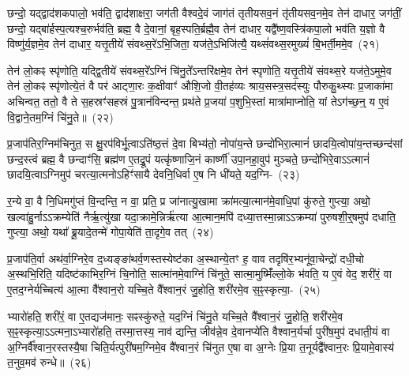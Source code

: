 छन्दो॒ यद्द्वाद॑श\-कपालो॒ भव॑ति॒ द्वाद॑शाक्षरा॒ जग॑ती वैश्वदे॒वं जाग॑तं तृतीय\-सव॒नं तृ॑तीय\-सव॒नमे॒व तेन॑ दाधार॒ जग॑तीं॒ छन्दो॒ यद्बा॑र्\mbox{}हस्प॒त्यश्च॒रुर्भव॑ति॒ ब्रह्म॒ वै दे॒वानां॒ बृह॒स्पति॒र्ब्रह्मै॒व तेन॑ दाधार॒ यद्वै᳚ष्ण॒वस्त्रि॑कपा॒लो भव॑ति य॒ज्ञो वै विष्णु॑र्य॒ज्ञमे॒व तेन॑ दाधार॒ यत्तृ॒तीये॑ संवथ्स॒रे॑\-ऽभि॒जिता॒ यज॑ते॒\-ऽभिजि॑त्यै॒ यथ्सं॑वथ्स॒रमुख्यं॑ बि॒भर्ती॒ममे॒व~(२१)\ip

तेन॑ लो॒कꣴ स्पृ॑णोति॒ यद्द्वि॒तीये॑ संवथ्स॒रे᳚\-ऽग्निं चि॑नु॒ते᳚\-ऽन्तरि॑क्षमे॒व तेन॑ स्पृणोति॒ यत्तृ॒तीये॑ संवथ्स॒रे यज॑ते॒\-ऽमुमे॒व तेन॑ लो॒कꣴ स्पृ॑णोत्ये॒तं वै पर॑ आट्णा॒रः क॒क्षीवाꣳ॑ औशि॒जो वी॒तह॑व्यः श्राय॒सस्त्र॒सद॑स्युः पौरुकु॒थ्स्यः प्र॒जाका॑मा अचिन्वत॒ ततो॒ वै ते स॒हस्रꣳ॑सहस्रं पु॒त्रान॑विन्दन्त॒ प्रथ॑ते प्र॒जया॑ प॒शुभि॒स्तां मात्रा॑माप्नोति॒ यां ते\-ऽग॑च्छ॒न्॒ य ए॒वं वि॒द्वाने॒तम॒ग्निं चि॑नु॒ते॥~(२२)\ip

{\anuvakamend[{दा॒धा॒र॒ त्रि॒ष्टुभ॑मि॒ममे॒वैवं च॒त्वारि॑ च}]}

प्र॒जा\-प॑तिर॒ग्निम॑चिनुत॒ स क्षु॒रप॑विर्भू॒त्वाऽति॑ष्ठ॒त्तं दे॒वा बिभ्य॑तो॒ नोपा॑य॒न्ते छन्दो॑भिरा॒त्मानं॑ छादयि॒त्वोपा॑य॒न्तच्छन्द॑सां छन्द॒स्त्वं ब्रह्म॒ वै छन्दाꣳ॑सि॒ ब्रह्म॑ण ए॒तद्रू॒पं यत्कृ॑ष्णाजि॒नं कार्ष्णी॑ उपा॒नहा॒वुप॑ मुञ्चते॒ छन्दो॑भिरे॒वा\-ऽऽत्मानं॑ छादयि॒त्वा\-ऽग्निमुप॑ चरत्या॒त्मनो\-ऽहिꣳ॑सायै देवनि॒धिर्वा ए॒ष नि धी॑यते॒ यद॒ग्नि-~(२३)\ip

र॒न्ये वा॒ वै नि॒धिमगु॑प्तं वि॒न्दन्ति॒ न वा॒ प्रति॒ प्र जा॑नात्यु॒खामा क्रा॑मत्या॒त्मान॑मे॒वाधि॒पां कु॑रुते॒ गुप्त्या॒ अथो॒ खल्वा॑हु॒र्ना\-ऽऽक्रम्येति॑ नैर्\mbox{}ऋ॒त्यु॑खा यदा॒क्रामे॒न्निर्\mbox{}ऋ॑त्या आ॒त्मान॒मपि॑ दध्या॒त्तस्मा॒न्ना\-ऽऽक्रम्या॑ पुरुषशी॒र्॒\mbox{}षमुप॑ दधाति॒ गुप्त्या॒ अथो॒ यथा᳚ ब्रू॒यादे॒तन्मे॑ गोपा॒येति॑ ता॒दृगे॒व तत्~(२४)\ip

प्र॒जा\-प॑ति॒र्वा अथ॑र्वा॒ग्निरे॒व द॒ध्यङ्ङा॑थर्व॒णस्तस्येष्ट॑का अ॒स्थान्ये॒तꣳ ह॒ वाव तदृषि॑र॒भ्यनू॑वा॒चेन्द्रो॑ दधी॒चो अ॒स्थभि॒रिति॒ यदिष्ट॑काभिर॒ग्निं चि॒नोति॒ सात्मा॑नमे॒वाग्निं चि॑नुते॒ सात्मा॒मुष्मिँ॑ल्लो॒के भ॑वति॒ य ए॒वं वेद॒ शरी॑रं॒ वा ए॒तद॒ग्नेर्यच्चित्य॑ आ॒त्मा वै᳚श्वान॒रो यच्चि॒ते वै᳚श्वान॒रं जु॒होति॒ शरी॑रमे॒व स॒ꣴ॒स्कृत्या॒-~(२५)\ip

भ्यारो॑हति॒ शरी॑रं॒ वा ए॒तद्यज॑मानः॒ सꣴस्कु॑रुते॒ यद॒ग्निं चि॑नु॒ते यच्चि॒ते वै᳚श्वान॒रं जु॒होति॒ शरी॑रमे॒व स॒ꣴ॒स्कृत्या॒\-ऽऽत्मना॒\-ऽभ्यारो॑हति॒ तस्मा॒त्तस्य॒ नाव॑ द्यन्ति॒ जीव॑न्ने॒व दे॒वानप्ये॑ति वैश्वान॒र्यर्चा पुरी॑ष॒मुप॑ दधाती॒यं वा अ॒ग्निर्वै᳚श्वान॒रस्तस्यै॒षा चिति॒र्यत्पुरी॑षम॒ग्निमे॒व वै᳚श्वान॒रं चि॑नुत ए॒षा वा अ॒ग्नेः प्रि॒या त॒नूर्यद्वै᳚श्वान॒रः प्रि॒यामे॒वास्य॑ त॒नुव॒मव॑ रुन्धे॥~(२६)\ip


